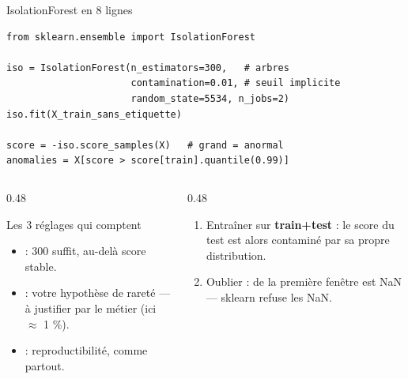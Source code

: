 \begin{frame}[fragile]{IsolationForest en 8 lignes}
\begin{codebox}
\begin{lstlisting}
from sklearn.ensemble import IsolationForest

iso = IsolationForest(n_estimators=300,   # arbres
                      contamination=0.01, # seuil implicite
                      random_state=5534, n_jobs=2)
iso.fit(X_train_sans_etiquette)

score = -iso.score_samples(X)   # grand = anormal
anomalies = X[score > score[train].quantile(0.99)]
\end{lstlisting}
\end{codebox}
\begin{columns}[t]
\begin{column}{0.48\textwidth}
\begin{block}{Les 3 réglages qui comptent}
\begin{itemize}
\item {} : 300 suffit, au-delà score stable.
\item {} : votre hypothèse de rareté --- à
justifier par le métier (ici $\approx$ 1 \%).
\item {} : reproductibilité, comme partout.
\end{itemize}
\end{block}
\end{column}
\begin{column}{0.48\textwidth}
\begin{wbox}
\begin{enumerate}
\item Entraîner sur \textbf{train+test} : le score du test est
alors contaminé par sa propre distribution.
\item Oublier  :  de la première fenêtre
est NaN --- sklearn refuse les NaN.
\end{enumerate}
\end{wbox}
\end{column}
\end{columns}
\end{frame}

